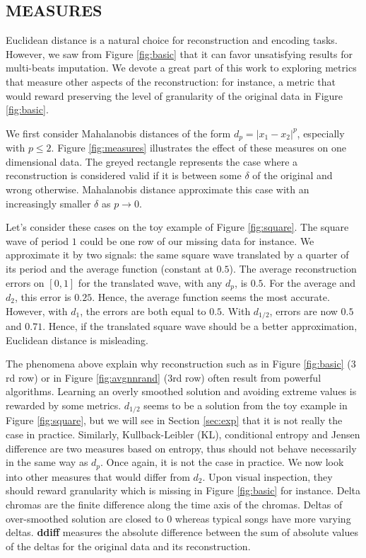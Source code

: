\documentclass{article}
\begin{document}
\subsection{MEASURES}
\label{ssec:measures}
Euclidean distance is a natural choice for reconstruction and encoding
tasks. However, we saw from Figure \ref{fig:basic} that it can favor
unsatisfying results for multi-beats imputation. We devote a great
part of this work to exploring metrics that measure other aspects of
the reconstruction: for instance, a metric that would reward
preserving the level of granularity of the original data in Figure
\ref{fig:basic}.

We first consider Mahalanobis distances of the form $d_p =
|x_1-x_2|^p$, especially with $p \leq 2$. Figure \ref{fig:measures}
illustrates the effect of these measures on one dimensional data.  The
greyed rectangle represents the case where a reconstruction is
considered valid if it is between some $\delta$ of the original and
wrong otherwise.  Mahalanobis distance approximate this case with an
increasingly smaller $\delta$ as $p \rightarrow 0$.

Let's consider these cases on the toy example of Figure
\ref{fig:square}.  The square wave of period $1$ could be one row of
our missing data for instance.  We approximate it by two signals: the
same square wave translated by a quarter of its period and the average
function (constant at $0.5$). The average reconstruction errors on
$[0,1]$ for the translated wave, with any $d_p$, is $0.5$.  For the
average and $d_2$, this error is $0.25$.  Hence, the average function
seems the most accurate. However, with $d_1$, the errors are both
equal to $0.5$. With $d_{1/2}$, errors are now $0.5$ and
$0.71$. Hence, if the translated square wave should be a better
approximation, Euclidean distance is misleading.


The phenomena above explain why reconstruction such as in Figure
\ref{fig:basic} ($3$rd row) or in Figure \ref{fig:avgnnrand} ($3$rd
row) often result from powerful algorithms. Learning an overly
smoothed solution and avoiding extreme values is rewarded by some
metrics. $d_{1/2}$ seems to be a solution from the toy example in
Figure \ref{fig:square}, but we will see in Section \ref{sec:exp} that
it is not really the case in practice.  Similarly, Kullback-Leibler
(KL), conditional entropy and Jensen difference \cite{Michel1994} are
two measures based on entropy, thus should not behave necessarily in
the same way as $d_p$.  Once again, it is not the case in practice. We
now look into other measures that would differ from $d_2$.  Upon
visual inspection, they should reward granularity which is missing in
Figure \ref{fig:basic} for instance. Delta chromas are the finite
difference along the time axis of the chromas. Deltas of over-smoothed
solution are closed to $0$ whereas typical songs have more varying
deltas. \textbf{ddiff} measures the absolute difference between the
sum of absolute values of the deltas for the original data and its
reconstruction.
\end{document}
